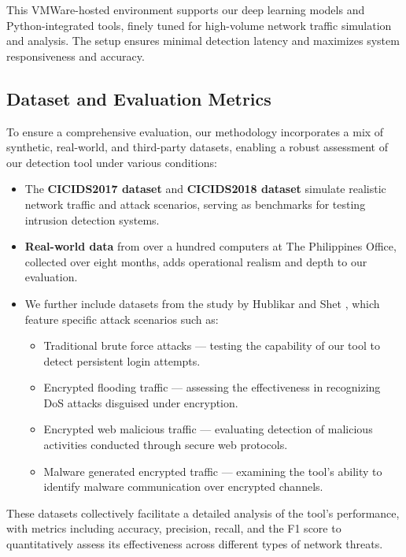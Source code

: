 This VMWare-hosted environment supports our deep learning models and Python-integrated tools, finely tuned for high-volume network traffic simulation and analysis. The setup ensures minimal detection latency and maximizes system responsiveness and accuracy.

\subsection{Dataset and Evaluation Metrics}\label{sec:env}
To ensure a comprehensive evaluation, our methodology incorporates a mix of synthetic, real-world, and third-party datasets, enabling a robust assessment of our detection tool under various conditions:
\begin{itemize}
    \item The \textbf{CICIDS2017 dataset} and \textbf{CICIDS2018 dataset} simulate realistic network traffic and attack scenarios, serving as benchmarks for testing intrusion detection systems.
    \item \textbf{Real-world data} from over a hundred computers at The Philippines Office, collected over eight months, adds operational realism and depth to our evaluation.
    \item We further include datasets from the study by Hublikar and Shet \cite{24}, which feature specific attack scenarios such as:
          \begin{itemize}
              \item Traditional brute force attacks — testing the capability of our tool to detect persistent login attempts.
              \item Encrypted flooding traffic — assessing the effectiveness in recognizing DoS attacks disguised under encryption.
              \item Encrypted web malicious traffic — evaluating detection of malicious activities conducted through secure web protocols.
              \item Malware generated encrypted traffic — examining the tool’s ability to identify malware communication over encrypted channels.
          \end{itemize}
\end{itemize}
These datasets collectively facilitate a detailed analysis of the tool's performance, with metrics including accuracy, precision, recall, and the F1 score to quantitatively assess its effectiveness across different types of network threats.

